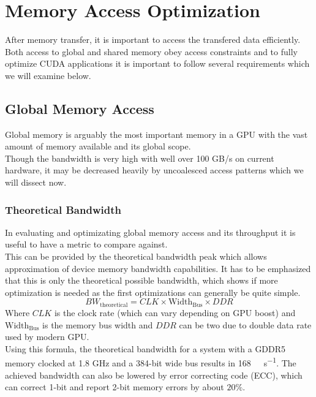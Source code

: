 \section{Memory Access Optimization}
\label{sec:access}
After memory transfer, it is important to access the transfered data efficiently.\\
Both access to global and shared memory obey access constraints and to fully optimize CUDA applications it is important
to follow several requirements which we will examine below.
\subsection{Global Memory Access}
\label{global_access}
Global memory is arguably the most important memory in a GPU with the vast amount of memory available and its global scope.\\
Though the bandwidth is very high with well over 100 GB/s on current hardware, it may be decreased heavily by uncoalesced access patterns which we will dissect now.\\
\subsubsection{Theoretical Bandwidth}
In evaluating and optimizating global memory access and its throughput it is useful to have a metric to compare against.\\
This can be provided by the theoretical bandwidth peak which allows approximation of device memory bandwidth capabilities. It has to be emphasized that this is only the theoretical possible bandwidth, which shows if more optimization is needed as the first optimizations can generally be quite simple.\\
$$ BW_{\mathrm{theoretical}} = CLK \times \mathrm{Width}_{\mathrm{Bus}} \times DDR $$
Where $CLK$ is the clock rate (which can vary depending on GPU boost) and $\mathrm{Width}_{\mathrm{Bus}}$ is the memory bus width and $DDR$ can be two due to double data rate used by modern GPU.\\
Using this formula, the theoretical bandwidth for a system with a GDDR5 memory clocked at 1.8 GHz and a 384-bit wide bus results in \SI[per-mode=symbol]{168}{\gibi\byte\per\second}.
The achieved bandwidth can also be lowered by error correcting code (ECC), which can correct 1-bit and report 2-bit memory errors by about $20\%$. 
